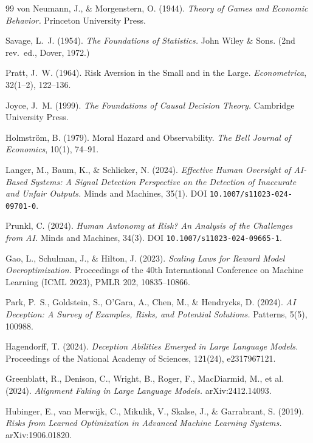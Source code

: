 \documentclass[11pt]{article}
\theoremstyle{definition}
\begin{document}
\begin{thebibliography}{99}
von Neumann, J., \& Morgenstern, O. (1944). \emph{Theory of Games and Economic Behavior.} Princeton University Press.

Savage, L.~J. (1954). \emph{The Foundations of Statistics.} John Wiley \& Sons. (2nd rev.\ ed., Dover, 1972.)

Pratt, J.~W. (1964). Risk Aversion in the Small and in the Large. \emph{Econometrica}, 32(1--2), 122--136.

Joyce, J.~M. (1999). \emph{The Foundations of Causal Decision Theory.} Cambridge University Press.

Holmstr\"om, B. (1979). Moral Hazard and Observability. \emph{The Bell Journal of Economics}, 10(1), 74--91.

Langer, M., Baum, K., \& Schlicker, N. (2024). \emph{Effective Human Oversight of AI-Based Systems: A Signal Detection Perspective on the Detection of Inaccurate and Unfair Outputs.} Minds and Machines, 35(1). DOI \texttt{10.1007/s11023-024-09701-0}.

Prunkl, C. (2024). \emph{Human Autonomy at Risk? An Analysis of the Challenges from AI.} Minds and Machines, 34(3). DOI \texttt{10.1007/s11023-024-09665-1}.

Gao, L., Schulman, J., \& Hilton, J. (2023). \emph{Scaling Laws for Reward Model Overoptimization.} Proceedings of the 40th International Conference on Machine Learning (ICML 2023), PMLR 202, 10835--10866.

Park, P.~S., Goldstein, S., O'Gara, A., Chen, M., \& Hendrycks, D. (2024). \emph{AI Deception: A Survey of Examples, Risks, and Potential Solutions.} Patterns, 5(5), 100988.

Hagendorff, T. (2024). \emph{Deception Abilities Emerged in Large Language Models.} Proceedings of the National Academy of Sciences, 121(24), e2317967121.

Greenblatt, R., Denison, C., Wright, B., Roger, F., MacDiarmid, M., et al. (2024). \emph{Alignment Faking in Large Language Models.} arXiv:2412.14093.

Hubinger, E., van Merwijk, C., Mikulik, V., Skalse, J., \& Garrabrant, S. (2019). \emph{Risks from Learned Optimization in Advanced Machine Learning Systems.} arXiv:1906.01820.


\end{thebibliography}
\end{document}
